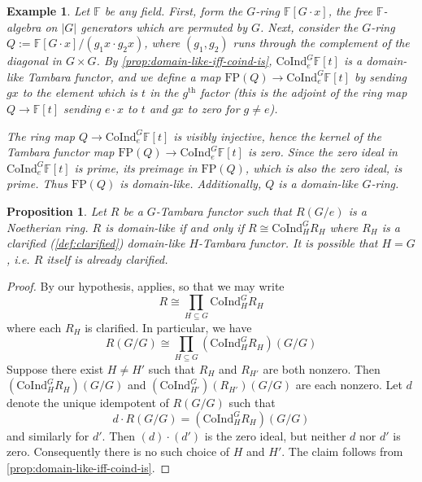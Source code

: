\documentclass[11pt,dvipsnames]{amsart}
\newcommand{\F}{\mathbb{F}}
\newtheorem{proposition}[theorem]{Proposition}
\theoremstyle{BoldRemark}
\newtheorem{example}[theorem]{Example}
\newcommand{\Coind}{\mathrm{CoInd}}
\renewcommand{\subset}{\subseteq}
\begin{document}
\begin{example}\label{ex:some-domain-like-things}
	Let $\F$ be any field. First, form the $G$-ring $\F[G \cdot x]$, the free $\F$-algebra on $|G|$ generators which are permuted by $G$. Next, consider the $G$-ring $Q := \F[G \cdot x]/(g_1 x \cdot g_2 x)$, where $(g_1,g_2)$ runs through the complement of the diagonal in $G \times G$. By \cref{prop:domain-like-iff-coind-is}, $\Coind_e^G \F[t]$ is a domain-like Tambara functor, and we define a map $\mathrm{FP}(Q) \rightarrow \Coind_e^G \F[t]$ by sending $g x$ to the element which is $t$ in the $g^{\textrm{th}}$ factor (this is the adjoint of the ring map $Q \rightarrow \F[t]$ sending $e \cdot x$ to $t$ and $g x$ to zero for $g \neq e$).
	
	The ring map $Q \rightarrow \Coind_e^G \F[t]$ is visibly injective, hence the kernel of the Tambara functor map $\mathrm{FP}(Q) \rightarrow \Coind_e^G \F[t]$ is zero. Since the zero ideal in $\Coind_e^G \F[t]$ is prime, its preimage in $\mathrm{FP}(Q)$, which is also the zero ideal, is prime. Thus $\mathrm{FP}(Q)$ is domain-like. Additionally, $Q$ is a domain-like $G$-ring.
\end{example}

\begin{proposition}\label{prop:domain-like-iff-coind-from-clarified-domain-like}
	Let $R$ be a $G$-Tambara functor such that $R(G/e)$ is a Noetherian ring. $R$ is domain-like if and only if $R \cong \Coind_H^G R_H$ where $R_H$ is a clarified (\cref{def:clarified}) domain-like $H$-Tambara functor. It is possible that $H = G$, i.e. $R$ itself is already clarified.
\end{proposition}

\begin{proof}
	By our hypothesis, \cite[Theorem D]{Wis25a} applies, so that we may write 
    \[ 
        R \cong \prod_{H \subset G} \Coind_H^G R_H 
    \] 
    where each $R_H$ is clarified. In particular, we have 
    \[ 
        R(G/G) \cong \prod_{H \subset G} (\Coind_H^G R_H)(G/G) 
    \] 
    Suppose there exist $H \neq H'$ such that $R_H$ and $R_{H'}$ are both nonzero. Then $(\Coind_H^G R_H)(G/G)$ and $(\Coind_{H'}^G)(R_{H'})(G/G)$ are each nonzero. Let $d$ denote the unique idempotent of $R(G/G)$ such that 
    \[ 
        d \cdot R(G/G) = (\Coind_H^G R_H)(G/G)
    \] 
    and similarly for $d'$. Then $(d) \cdot (d')$ is the zero ideal, but neither $d$ nor $d'$ is zero. Consequently there is no such choice of $H$ and $H'$. The claim follows from \cref{prop:domain-like-iff-coind-is}.
\end{proof}
\end{document}

